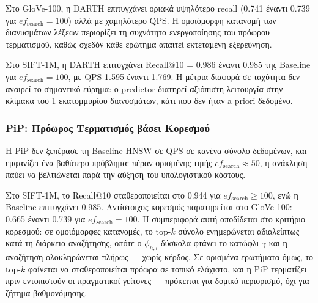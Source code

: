 \documentclass[12pt,a4paper]{article}
\begin{document}
Στο GloVe-100, η DARTH επιτυγχάνει οριακά υψηλότερο recall (0.741 έναντι 0.739 για $ef_{\text{search}}=100$) αλλά με χαμηλότερο QPS. Η ομοιόμορφη κατανομή των διανυσμάτων λέξεων περιορίζει τη συχνότητα ενεργοποίησης του πρόωρου τερματισμού, καθώς σχεδόν κάθε ερώτημα απαιτεί εκτεταμένη εξερεύνηση.

Στο SIFT-1M, η DARTH επιτυγχάνει Recall@10 = 0.986 έναντι 0.985 της Baseline για $ef_{\text{search}}=100$, με QPS 1.595 έναντι 1.769. Η μέτρια διαφορά σε ταχύτητα δεν αναιρεί το σημαντικό εύρημα: ο predictor διατηρεί αξιόπιστη λειτουργία στην κλίμακα του 1 εκατομμυρίου διανυσμάτων, κάτι που δεν ήταν a priori δεδομένο.

\subsubsection{PiP: Πρόωρος Τερματισμός βάσει Κορεσμού}
Η PiP δεν ξεπέρασε τη Baseline-HNSW σε QPS σε κανένα σύνολο δεδομένων, και εμφανίζει ένα βαθύτερο πρόβλημα: πέραν ορισμένης τιμής $ef_{\text{search}} \approx 50$, η ανάκληση παύει να βελτιώνεται παρά την αύξηση του υπολογιστικού κόστους.

Στο SIFT-1M, το Recall@10 σταθεροποιείται στο 0.944 για $ef_{\text{search}} \geq 100$, ενώ η Baseline επιτυγχάνει 0.985. Αντίστοιχος κορεσμός παρατηρείται στο GloVe-100: 0.665 έναντι 0.739 για $ef_{\text{search}}=100$. Η συμπεριφορά αυτή αποδίδεται στο κριτήριο κορεσμού: σε ομοιόμορφες κατανομές, το top-$k$ σύνολο ενημερώνεται αδιαλείπτως κατά τη διάρκεια αναζήτησης, οπότε ο $\phi_{h,l}$ δύσκολα φτάνει το κατώφλι $\gamma$ και η αναζήτηση ολοκληρώνεται πλήρως --- χωρίς κέρδος. Σε ορισμένα ερωτήματα όμως, το top-$k$ φαίνεται να σταθεροποιείται πρόωρα σε τοπικό ελάχιστο, και η PiP τερματίζει πριν εντοπιστούν οι πραγματικοί γείτονες --- πρόκειται για δομικό περιορισμό, όχι για ζήτημα βαθμονόμησης.
\end{document}
